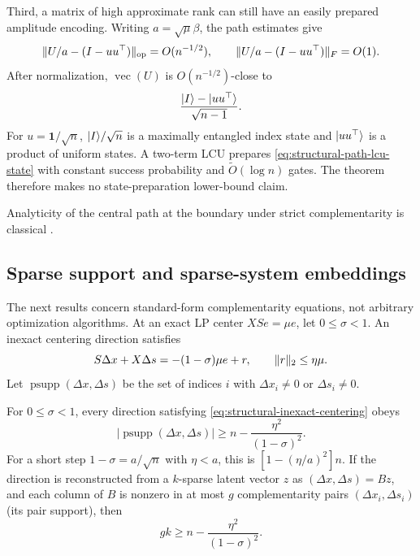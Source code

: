 Third, a matrix of high approximate rank can still have an easily prepared
amplitude encoding.
Writing $a=\sqrt\mu\beta$, the path estimates give
\begin{equation}
 \lVert U/a-(I-uu^\top)\rVert_{\rm op}=O(n^{-1/2}),\qquad
 \lVert U/a-(I-uu^\top)\rVert_F=O(1).                             \label{eq:structural-path-state-close}
\end{equation}
After normalization, $\operatorname{vec}(U)$ is $O(n^{-1/2})$-close to
\begin{equation}
 \frac{\lvert I\rangle-\lvert uu^\top\rangle}{\sqrt{n-1}}.                  \label{eq:structural-path-lcu-state}
\end{equation}
For $u=\mathbf1/\sqrt n$, $\lvert I\rangle/\sqrt n$ is a maximally entangled index
state and $\lvert uu^\top\rangle$ is a product of uniform states.  A two-term LCU
prepares \eqref{eq:structural-path-lcu-state} with constant success
probability and $\widetilde O(\log n)$ gates.  The theorem therefore makes no
state-preparation lower-bound claim.

Analyticity of the central path at the boundary under strict
complementarity is classical \cite{halicka2002-analyticity-of-the-central-path}.

\subsection{Sparse support and sparse-system embeddings}
\label{sec:structural-sparse-results}

The next results concern standard-form complementarity equations, not
arbitrary optimization algorithms.  At an exact LP center $XSe=\mu e$, let
$0\leq\sigma<1$.  An inexact centering direction satisfies
\begin{equation}
 S\Delta x+X\Delta s=-(1-\sigma)\mu e+r,\qquad
 \lVert r\rVert_2\leq\eta\mu.                                   \label{eq:structural-inexact-centering}
\end{equation}
Let $\operatorname{psupp}(\Delta x,\Delta s)$ be the set of indices $i$ with
$\Delta x_i\neq0$ or $\Delta s_i\neq0$.

\begin{theorem}
\label{thm:structural-support-barrier}
For $0\leq\sigma<1$, every direction satisfying
\eqref{eq:structural-inexact-centering} obeys
\begin{equation}
 \boxed{|\operatorname{psupp}(\Delta x,\Delta s)|
 \geq n-\frac{\eta^2}{(1-\sigma)^2}.}                    \label{eq:structural-support-count}
\end{equation}
For a short step $1-\sigma=a/\sqrt n$ with $\eta<a$, this is
$[1-(\eta/a)^2]n$.  If the direction is reconstructed from a $k$-sparse
latent vector $z$ as $(\Delta x,\Delta s)=Bz$, and each column of $B$ is
nonzero in at most $g$ complementarity pairs $(\Delta x_i,\Delta s_i)$ (its
pair support), then
\begin{equation}
 \boxed{gk\geq n-\frac{\eta^2}{(1-\sigma)^2}.}            \label{eq:structural-locality-product}
\end{equation}
\end{theorem}

